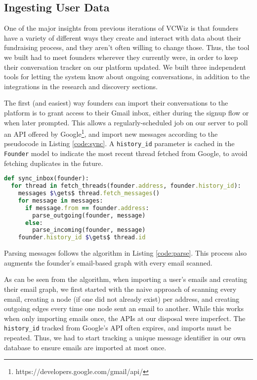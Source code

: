 \subsection{Ingesting User Data}
\label{vcwiz:ingesting}

One of the major insights from previous iterations of VCWiz is that founders have a variety of different ways they create and interact with data about their fundraising process, and they aren't often willing to change those. Thus, the tool we built had to meet founders wherever they currently were, in order to keep their conversation tracker on our platform updated. We built three independent tools for letting the system know about ongoing conversations, in addition to the integrations in the research and discovery sections.

The first (and easiest) way founders can import their conversations to the platform is to grant access to their Gmail inbox, either during the signup flow or when later prompted. This allows a regularly-scheduled job on our server to poll an API offered by Google\footnote{https://developers.google.com/gmail/api/}, and import new messages according to the pseudocode in Listing \ref{code:sync}. A \texttt{history\_id} parameter is cached in the \texttt{Founder} model to indicate the most recent thread fetched from Google, to avoid fetching duplicates in the future.

\begin{lstlisting}[frame=single,mathescape=true,language=Ruby,basicstyle=\footnotesize,columns=fullflexible,caption={Sync Inbox},label={code:sync}]
def sync_inbox(founder):
  for thread in fetch_threads(founder.address, founder.history_id):
    messages $\gets$ thread.fetch_messages()
    for message in messages:
      if message.from == founder.address:
        parse_outgoing(founder, message)
      else:
        parse_incoming(founder, message)
    founder.history_id $\gets$ thread.id
\end{lstlisting}

Parsing messages follows the algorithm in Listing \ref{code:parse}. This process also augments the founder's email-based graph with every email scanned.

As can be seen from the algorithm, when importing a user's emails and creating their email graph, we first started with the naive approach of scanning every email, creating a node (if one did not already exist) per address, and creating outgoing edges every time one node sent an email to another. While this works when only importing emails once, the APIs at our disposal were imperfect. The \texttt{history\_id} tracked from Google's API often expires, and imports must be repeated. Thus, we had to start tracking a unique message identifier in our own database to ensure emails are imported at most once.

